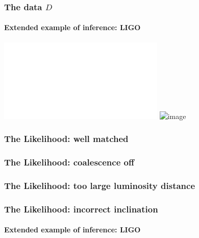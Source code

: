 \documentclass[%
]{beamer}
\begin{document}
\begin{frame}
    \frametitle{The data $D$}
    \framesubtitle{Extended example of inference: LIGO}
    \includegraphics<1>[width=\textwidth]{./figures/ligo_data.pdf}
    \includegraphics<2>[width=\textwidth]{./figures/ligo_actual.png}
\end{frame}

\begin{frame}
    \frametitle<1>{The Likelihood: well matched}
    \frametitle<2>{The Likelihood: coalescence off}
    \frametitle<3>{The Likelihood: too large luminosity distance}
    \frametitle<4>{The Likelihood: incorrect inclination}
    \framesubtitle{Extended example of inference: LIGO}

\end{frame}
\end{document}
